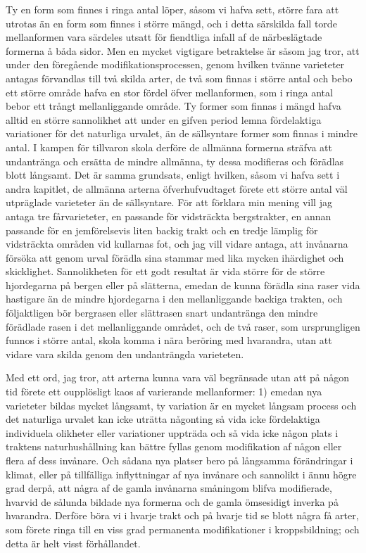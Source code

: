 Ty en form som finnes i ringa antal löper, såsom vi hafva sett, större fara att utrotas än en form som finnes i större mängd, och i detta särskilda fall torde mellanformen vara särdeles utsatt för fiendtliga infall af de närbeslägtade formerna å båda sidor. Men en mycket vigtigare betraktelse är såsom jag tror, att under den föregående modifikationsprocessen, genom hvilken tvänne varieteter antagas förvandlas till två skilda arter, de två som finnas i större antal och bebo ett större område hafva en stor fördel öfver mellanformen, som i ringa antal bebor ett trångt mellanliggande område. Ty former som finnas i mängd hafva alltid en större sannolikhet att under en gifven period lemna fördelaktiga variationer för det naturliga urvalet, än de sällsyntare former som finnas i mindre antal. I kampen för tillvaron skola derföre de allmänna formerna sträfva att undantränga och ersätta de mindre allmänna, ty dessa modifieras och förädlas blott långsamt. Det är samma grundsats, enligt hvilken, såsom vi hafva sett i andra kapitlet, de allmänna arterna öfverhufvudtaget förete ett större antal väl utpräglade varieteter än de sällsyntare. För att förklara min mening vill jag antaga tre fårvarieteter, en passande för vidsträckta bergstrakter, en annan passande för en jemförelsevis liten backig trakt och en tredje lämplig för vidsträckta områden vid kullarnas fot, och jag vill vidare antaga, att invånarna försöka att genom urval förädla sina stammar med lika mycken ihärdighet och skicklighet. Sannolikheten för ett godt resultat är vida större för de större hjordegarna på bergen eller på slätterna, emedan de kunna förädla sina raser vida hastigare än de mindre hjordegarna i den mellanliggande backiga trakten, och följaktligen bör bergrasen eller slättrasen snart undantränga den mindre förädlade rasen i det mellanliggande området, och de två raser, som ursprungligen funnos i större antal, skola komma i nära beröring med hvarandra, utan att vidare vara skilda genom den undanträngda varieteten.

Med ett ord, jag tror, att arterna kunna vara väl begränsade utan att på någon tid förete ett oupplösligt kaos af varierande mellanformer: 1) emedan nya varieteter bildas mycket långsamt, ty variation är en mycket långsam process och det naturliga urvalet kan icke uträtta någonting så vida icke fördelaktiga individuela olikheter eller variationer uppträda och så vida icke någon plats i traktens naturhushållning kan bättre fyllas genom modifikation af någon eller flera af dess invånare. Och sådana nya platser bero på långsamma förändringar i klimat, eller på tillfälliga inflyttningar af nya invånare och sannolikt i ännu högre grad derpå, att några af de gamla invånarna småningom blifva modifierade, hvarvid de sålunda bildade nya formerna och de gamla ömsesidigt inverka på hvarandra. Derföre böra vi i hvarje trakt och på hvarje tid se blott några få arter, som förete ringa till en viss grad permanenta modifikationer i kroppsbildning; och detta är helt visst förhållandet.

